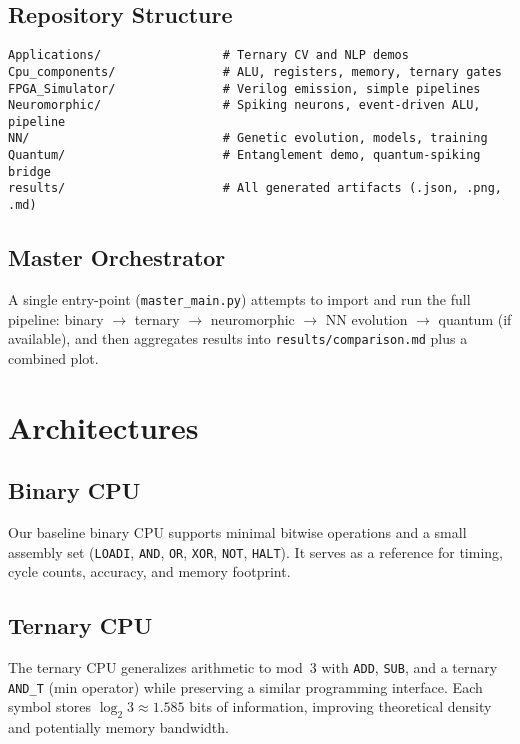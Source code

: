 \documentclass[11pt,a4paper]{article}
\newcommand{\bitspertrit}{\ensuremath{\log_2 3 \approx 1.585}}
\newcommand{\code}[1]{\texttt{#1}}
\begin{document}
\subsection{Repository Structure}
\begin{lstlisting}[language={},caption={Key directories in TrinCore},label={lst:layout}]
Applications/                 # Ternary CV and NLP demos
Cpu_components/               # ALU, registers, memory, ternary gates
FPGA_Simulator/               # Verilog emission, simple pipelines
Neuromorphic/                 # Spiking neurons, event-driven ALU, pipeline
NN/                           # Genetic evolution, models, training
Quantum/                      # Entanglement demo, quantum-spiking bridge
results/                      # All generated artifacts (.json, .png, .md)
\end{lstlisting}

\subsection{Master Orchestrator}
A single entry-point (\code{master\_main.py}) attempts to import and run
the full pipeline: binary $\rightarrow$ ternary $\rightarrow$ neuromorphic
$\rightarrow$ NN evolution $\rightarrow$ quantum (if available), and then
aggregates results into \code{results/comparison.md} plus a combined plot.

\section{Architectures}
\label{sec:architectures}

\subsection{Binary CPU}
Our baseline binary CPU supports minimal bitwise operations and a small
assembly set (\code{LOADI}, \code{AND}, \code{OR}, \code{XOR}, \code{NOT},
\code{HALT}). It serves as a reference for timing, cycle counts, accuracy,
and memory footprint.

\subsection{Ternary CPU}
The ternary CPU generalizes arithmetic to mod~3 with \code{ADD}, \code{SUB},
and a ternary \code{AND\_T} (min operator) while preserving a similar
programming interface. Each symbol stores \bitspertrit{} bits of information,
improving theoretical density and potentially memory bandwidth.
\end{document}
